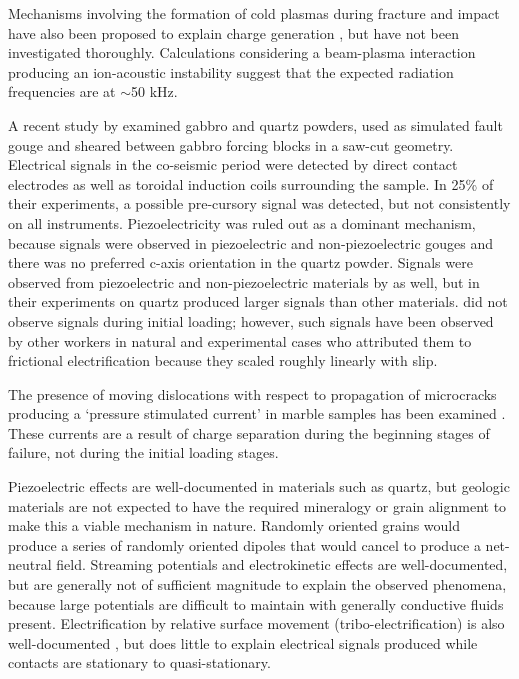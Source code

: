 Mechanisms involving the formation of cold plasmas during fracture and impact have also been proposed to explain charge generation \citep{Martelli:1985wv}, but have not been investigated thoroughly.  Calculations considering a beam-plasma interaction producing an ion-acoustic instability suggest that the expected radiation frequencies are at $\sim$50 kHz.  

A recent study by \citet{Onuma:2011ii} examined gabbro and quartz powders, used as simulated fault gouge and sheared between gabbro forcing blocks in a saw-cut geometry.  Electrical signals in the co-seismic period were detected by direct contact electrodes as well as toroidal induction coils surrounding the sample.  In 25\% of their experiments, a possible pre-cursory signal was detected, but not consistently on all instruments.  Piezoelectricity was ruled out as a dominant mechanism, because signals were observed in piezoelectric and non-piezoelectric gouges and there was no preferred c-axis orientation in the quartz powder.  Signals were observed from piezoelectric and non-piezoelectric materials by \citet{Cress:1987wy} as well, but in their experiments on quartz produced larger signals than other materials.  \citet{Onuma:2011ii} did not observe signals during initial loading; however, such signals have been observed by other workers in natural and experimental cases \citep{Takeuchi:2010kc} who attributed them to frictional electrification because they scaled roughly linearly with slip.

The presence of moving dislocations with respect to propagation of microcracks producing a `pressure stimulated current'  in marble samples has been examined \citep{Triantis:2008uo}.  These currents are a result of charge separation during the beginning stages of failure, not during the initial loading stages.  

Piezoelectric effects are well-documented in materials such as quartz, but geologic materials are not expected to have the required mineralogy or grain alignment to make this a viable mechanism in nature.  Randomly oriented grains would produce a series of randomly oriented dipoles that would cancel to produce a net-neutral field.  Streaming potentials and electrokinetic effects \citep{Mizutani:1976tn} are well-documented, but are generally not of sufficient magnitude to explain the observed phenomena, because large potentials are difficult to maintain with generally conductive fluids present.  Electrification by relative surface movement (tribo-electrification) is also well-documented \citep{Pingali:2009je,Pahtz:2010cq}, but does little to explain electrical signals produced while contacts are stationary to quasi-stationary. 

